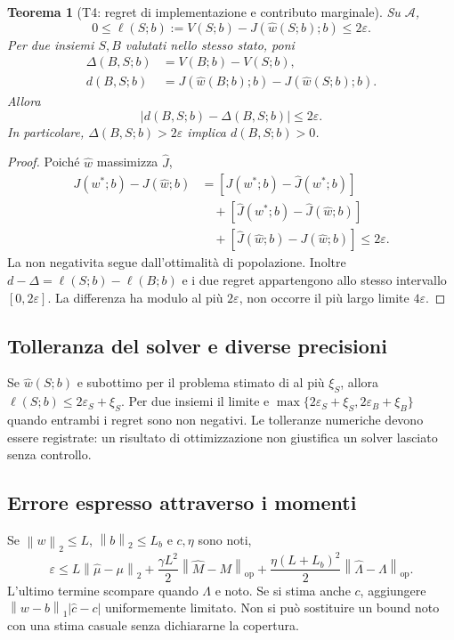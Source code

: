 \documentclass[11pt,a4paper]{article}
\newtheorem{theorem}{Teorema}[section]
\theoremstyle{definition}\newtheorem{definition}[theorem]{Definizione}
\theoremstyle{remark}\newtheorem{remark}[theorem]{Osservazione}
\newcommand{\op}{\mathrm{op}}\newcommand{\ind}{\mathbf 1}\newcommand{\pos}[1]{\left[#1\right]_+}
\newcommand{\norm}[1]{\left\lVert#1\right\rVert}\newcommand{\abs}[1]{\left|#1\right|}
\begin{document}
\begin{theorem}[T4: regret di implementazione e contributo marginale]
Su $\mathcal A$,
\begin{equation}
 0\le \ell(S;b):=V(S;b)-J(\widehat w(S;b);b)\le2\varepsilon.
\end{equation}
Per due insiemi $S,B$ valutati nello stesso stato, poni
\begin{align}
 \Delta(B,S;b)&=V(B;b)-V(S;b),\\
 d(B,S;b)&=J(\widehat w(B;b);b)-J(\widehat w(S;b);b).
\end{align}
Allora
\begin{equation}
 |d(B,S;b)-\Delta(B,S;b)|\le2\varepsilon.\label{eq:T4}
\end{equation}
In particolare, $\Delta(B,S;b)>2\varepsilon$ implica $d(B,S;b)>0$.
\end{theorem}
\begin{proof}
Poiché $\widehat w$ massimizza $\widehat J$,
\begin{align*}
 J(w^*;b)-J(\widehat w;b)
 &=[J(w^*;b)-\widehat J(w^*;b)]\\
 &\quad+[\widehat J(w^*;b)-\widehat J(\widehat w;b)]\\
 &\quad+[\widehat J(\widehat w;b)-J(\widehat w;b)]\le2\varepsilon.
\end{align*}
La non negativita segue dall'ottimalità di popolazione. Inoltre $d-\Delta=\ell(S;b)-\ell(B;b)$ e i due regret appartengono allo stesso intervallo $[0,2\varepsilon]$. La differenza ha modulo al più $2\varepsilon$, non occorre il più largo limite $4\varepsilon$.
\end{proof}

\subsection{Tolleranza del solver e diverse precisioni}
Se $\widehat w(S;b)$ e subottimo per il problema stimato di al più $\xi_S$, allora $\ell(S;b)\le2\varepsilon_S+\xi_S$. Per due insiemi il limite e $\max\{2\varepsilon_S+\xi_S,2\varepsilon_B+\xi_B\}$ quando entrambi i regret sono non negativi. Le tolleranze numeriche devono essere registrate: un risultato di ottimizzazione non giustifica un solver lasciato senza controllo.

\subsection{Errore espresso attraverso i momenti}
Se $\norm{w}_2\le L$, $\norm{b}_2\le L_b$ e $c,\eta$ sono noti,
\begin{equation}
 \varepsilon\le L\norm{\widehat\mu-\mu}_2
 +\frac{\gamma L^2}{2}\norm{\widehat M-M}_{\op}
 +\frac{\eta(L+L_b)^2}{2}\norm{\widehat\Lambda-\Lambda}_{\op}.
\end{equation}
L'ultimo termine scompare quando $\Lambda$ e noto. Se si stima anche $c$, aggiungere $\norm{w-b}_1|\widehat c-c|$ uniformemente limitato. Non si può sostituire un bound noto con una stima casuale senza dichiararne la copertura.
\end{document}

